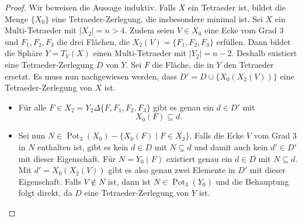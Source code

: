 \documentclass[12pt,titlepage,twoside,cleardoublepage]{article}
\theoremstyle{nummermitklammern}
\numberwithin{equation}{section}
\DeclareMathOperator{\Pot}{Pot}
\begin{document}
\begin{proof}
Wir beweisen die Aussage induktiv. Falls $X$ ein Tetraeder ist, bildet die Menge $\{X_0\}$ eine Tetraeder-Zerlegung, die insbesondere minimal ist.
Sei $X$ ein Multi-Tetraeder mit $\vert X_2\vert =n > 4.$ Zudem seien $V\in X_0$ eine Ecke vom Grad 3 und $F_1,F_2,F_3$ die drei Flächen, die $X_2(V)=\{F_1,F_2,F_3\}$ erfüllen.  Dann bildet die Sphäre $Y=T_V(X)$ einen Multi-Tetraeder mit $\vert Y_2 \vert =n-2.$ Deshalb existiert eine Tetraeder-Zerlegung $D$ von $Y.$ Sei $F$ die Fläche, die in $Y$ den Tetraeder ersetzt. Es muss nun nachgewiesen werden, dass $D'=D\cup \{X_0(X_2(V))\}$ eine Tetraeder-Zerlegung von $X$ ist.
\begin{itemize}
\item Für alle $F\in X_2= Y_2 \Delta\{F,F_1,F_2,F_3\}$ gibt es genau ein $d\in D'$ mit 
\[
X_0(F)\subseteq d.
\] 
\item Sei nun $N\in \Pot_3(X_0)-\{X_0(F)\mid F\in X_2\}.$ Falls die Ecke $V$ vom Grad 3 in $N$ enthalten ist, 
 gibt es kein $d\in D$ mit $N\subseteq d$ und damit auch kein $d'\in D'$ mit dieser Eigenschaft. Für $N=Y_0(F)$ existiert genau ein $d \in D$ mit $N\subseteq d.$ Mit $d'=X_0(X_2(V))$ gibt es also genau zwei Elemente in $D'$ mit dieser Eigenschaft. Falls $V\notin N$ ist, dann ist $N\in \Pot_3(Y_0)$ und die Behauptung folgt direkt, da $D$ eine Tetraeder-Zerlegung von $Y$ ist.
\end{itemize}
\end{proof}
\end{document}
